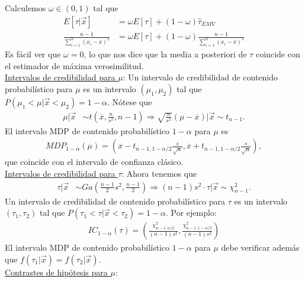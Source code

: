 Calculemos $\omega \in (0,1)$ tal que 
\begin{align*}
    E[\tau  | \vec{x}] &= \omega E[\tau]  + (1 - \omega) \widehat{\tau }_{EMV} \\
    \frac{n-1}{ \sum_{i=1}^{n} (x_i - \overline{x})^2} &= \omega E[\tau] + (1-\omega)\frac{n-1}{ \sum_{i=1}^{n} (x_i - \overline{x})^2} 
\end{align*}
Es fácil ver que $\omega = 0$, lo que nos dice que la media a posteriori de $\tau$ coincide con el estimador de máxima verosimilitud.
\\
\newline
\noindent \underline{Intervalos de credibilidad para $\mu$}: Un intervalo de credibilidad de contenido probabilístico para $\mu$ es un intervalo $(\mu_1,\mu_2)$ tal que $P(\mu_1 < \mu | \vec{x} < \mu_2) = 1 - \alpha$. Nótese que
\begin{align*}
    \mu | \vec{x} & \sim t \left( \overline{x}, \frac{n}{s^2},n-1 \right) \Longrightarrow \sqrt{\frac{n}{s^2}}(\mu - \overline{x}) | \vec{x} \sim t_{n-1}.
\end{align*}
El intervalo MDP de contenido probabilístico $1-\alpha$ para $\mu$ es
\begin{align*}
MDP_{1-\alpha}(\mu) = \left( \overline{x} - t_{n-1, 1-\alpha/2}\frac{s}{\sqrt{n}}, \overline{x} + t_{n-1, 1-\alpha/2}\frac{s}{\sqrt{n}} \right),
\end{align*}
que coincide con el intervalo de confianza clásico.
\\
\newline
\noindent \underline{Intervalos de credibilidad para $\tau$}: Ahora tenemos que
\begin{align*}
    \tau | \vec{x} & \sim Ga\left( \frac{n-1}{2}s^2, \frac{n-1}{2} \right) \Longrightarrow (n-1)s^2 \cdot \tau | \vec{x} \sim \chi^2_{n-1}.
\end{align*}
Un intervalo de credibilidad de contenido probabilístico para $\tau$ es un intervalo $(\tau_1,\tau_2)$ tal que $P(\tau_1 < \tau | \vec{x} < \tau_2) = 1 - \alpha$. Por ejemplo:
\begin{align*}
    IC_{1-\alpha}(\tau) = \left( \frac{\chi^2_{n-1, \alpha/2}}{(n-1)s^2}, \frac{\chi^2_{n-1,1- \alpha/2}}{(n-1)s^2} \right)
\end{align*}
El intervalo MDP de contenido probabilístico $1-\alpha$ para $\mu$ debe verificar además que $f(\tau_1 | \vec{x}) = f(\tau_2 | \vec{x})$.
\\
\newline
\noindent \underline{Contrastes de hipótesis para $\mu$}:

